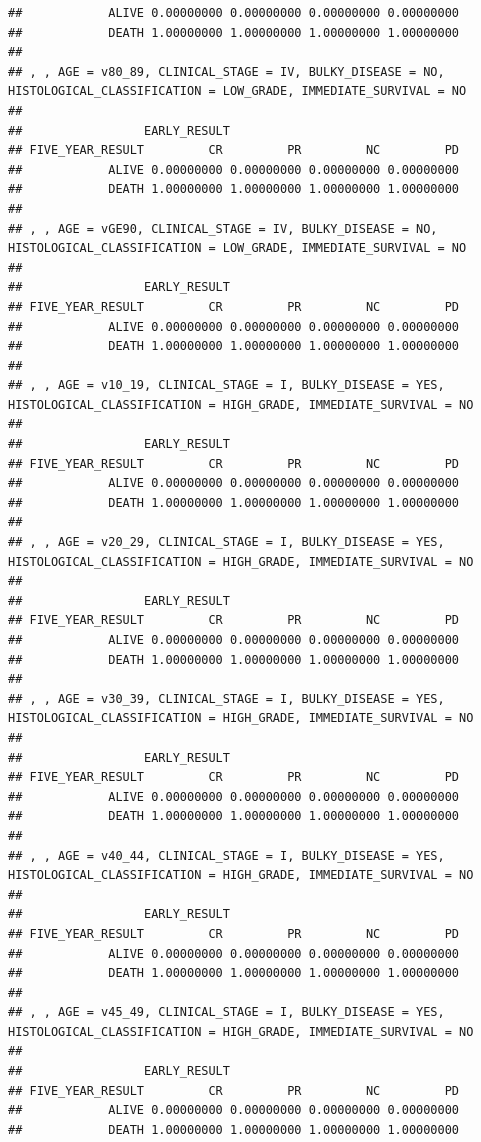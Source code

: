 \documentclass[]{article}
\begin{document}
\begin{verbatim}
##            ALIVE 0.00000000 0.00000000 0.00000000 0.00000000
##            DEATH 1.00000000 1.00000000 1.00000000 1.00000000
## 
## , , AGE = v80_89, CLINICAL_STAGE = IV, BULKY_DISEASE = NO, HISTOLOGICAL_CLASSIFICATION = LOW_GRADE, IMMEDIATE_SURVIVAL = NO
## 
##                 EARLY_RESULT
## FIVE_YEAR_RESULT         CR         PR         NC         PD
##            ALIVE 0.00000000 0.00000000 0.00000000 0.00000000
##            DEATH 1.00000000 1.00000000 1.00000000 1.00000000
## 
## , , AGE = vGE90, CLINICAL_STAGE = IV, BULKY_DISEASE = NO, HISTOLOGICAL_CLASSIFICATION = LOW_GRADE, IMMEDIATE_SURVIVAL = NO
## 
##                 EARLY_RESULT
## FIVE_YEAR_RESULT         CR         PR         NC         PD
##            ALIVE 0.00000000 0.00000000 0.00000000 0.00000000
##            DEATH 1.00000000 1.00000000 1.00000000 1.00000000
## 
## , , AGE = v10_19, CLINICAL_STAGE = I, BULKY_DISEASE = YES, HISTOLOGICAL_CLASSIFICATION = HIGH_GRADE, IMMEDIATE_SURVIVAL = NO
## 
##                 EARLY_RESULT
## FIVE_YEAR_RESULT         CR         PR         NC         PD
##            ALIVE 0.00000000 0.00000000 0.00000000 0.00000000
##            DEATH 1.00000000 1.00000000 1.00000000 1.00000000
## 
## , , AGE = v20_29, CLINICAL_STAGE = I, BULKY_DISEASE = YES, HISTOLOGICAL_CLASSIFICATION = HIGH_GRADE, IMMEDIATE_SURVIVAL = NO
## 
##                 EARLY_RESULT
## FIVE_YEAR_RESULT         CR         PR         NC         PD
##            ALIVE 0.00000000 0.00000000 0.00000000 0.00000000
##            DEATH 1.00000000 1.00000000 1.00000000 1.00000000
## 
## , , AGE = v30_39, CLINICAL_STAGE = I, BULKY_DISEASE = YES, HISTOLOGICAL_CLASSIFICATION = HIGH_GRADE, IMMEDIATE_SURVIVAL = NO
## 
##                 EARLY_RESULT
## FIVE_YEAR_RESULT         CR         PR         NC         PD
##            ALIVE 0.00000000 0.00000000 0.00000000 0.00000000
##            DEATH 1.00000000 1.00000000 1.00000000 1.00000000
## 
## , , AGE = v40_44, CLINICAL_STAGE = I, BULKY_DISEASE = YES, HISTOLOGICAL_CLASSIFICATION = HIGH_GRADE, IMMEDIATE_SURVIVAL = NO
## 
##                 EARLY_RESULT
## FIVE_YEAR_RESULT         CR         PR         NC         PD
##            ALIVE 0.00000000 0.00000000 0.00000000 0.00000000
##            DEATH 1.00000000 1.00000000 1.00000000 1.00000000
## 
## , , AGE = v45_49, CLINICAL_STAGE = I, BULKY_DISEASE = YES, HISTOLOGICAL_CLASSIFICATION = HIGH_GRADE, IMMEDIATE_SURVIVAL = NO
## 
##                 EARLY_RESULT
## FIVE_YEAR_RESULT         CR         PR         NC         PD
##            ALIVE 0.00000000 0.00000000 0.00000000 0.00000000
##            DEATH 1.00000000 1.00000000 1.00000000 1.00000000

\end{verbatim}
\end{document}
